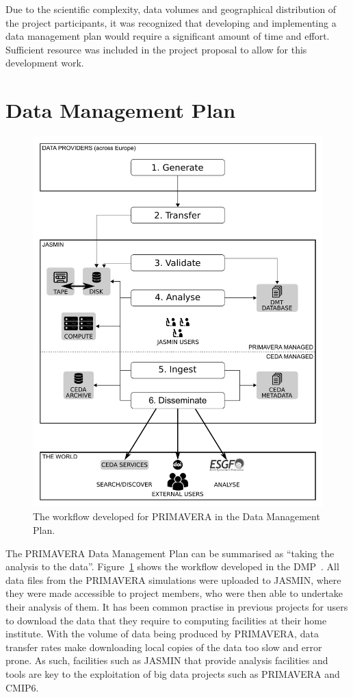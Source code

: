 \documentclass[gmd, manuscript]{copernicus}
\begin{document}
Due to the scientific complexity, data volumes and geographical distribution of the project participants, it was recognized that developing and implementing a data management plan would require a significant amount of time and effort. Sufficient resource was included in the project proposal to allow for this development work.


\section{Data Management Plan}

\begin{figure}[t]
\includegraphics[width=12cm]{fig01.pdf}
\caption{The workflow developed for PRIMAVERA in the Data Management Plan.}
\label{dmp_workflow}
\end{figure}

The PRIMAVERA Data Management Plan can be summarised as ``taking the analysis to the data''. Figure~\ref{dmp_workflow} shows the workflow developed in the DMP~\citep{Mizielinski2016}. All data files from the PRIMAVERA simulations were uploaded to JASMIN, where they were made accessible to project members, who were then able to undertake their analysis of them. It has been common practise in previous projects for users to download the data that they require to computing facilities at their home institute. With the volume of data being produced by PRIMAVERA, data transfer rates make downloading local copies of the data too slow and error prone. As such, facilities such as JASMIN that provide analysis facilities and tools are key to the exploitation of big data projects such as PRIMAVERA and CMIP6.
\end{document}

